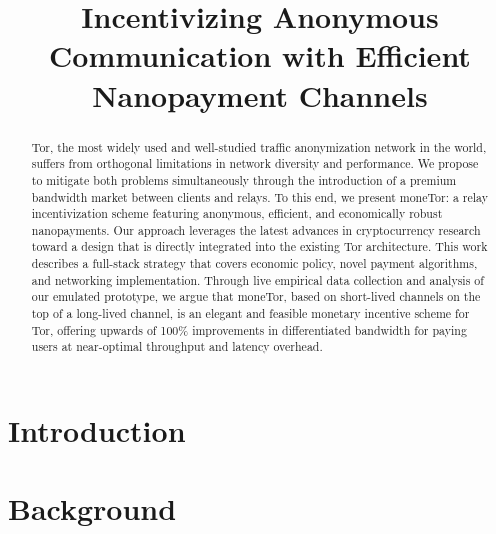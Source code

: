 \documentclass[USenglish,oneside,twocolumn]{article}
\begin{document}
 

\title{\huge Incentivizing Anonymous Communication with Efficient Nanopayment Channels} %


\begin{abstract}
{Tor, the most widely used and well-studied traffic anonymization network in
  the world, suffers from orthogonal limitations in network diversity and
  performance. We propose to mitigate both problems simultaneously through the
  introduction of a premium bandwidth market between clients and relays. To this
  end, we present moneTor: a relay incentivization scheme featuring anonymous,
  efficient, and economically robust nanopayments. Our approach leverages the
  latest advances in cryptocurrency research toward a design that is directly
  integrated into the existing Tor architecture. This work describes a
  full-stack strategy that covers economic policy, novel payment algorithms, and
  networking implementation. Through live empirical data collection and analysis
  of our emulated prototype, we argue that moneTor, based on short-lived channels on the top of a long-lived channel, is an elegant and
  feasible monetary incentive scheme for Tor, offering upwards of 100\%
  improvements in differentiated bandwidth for paying users at near-optimal
  throughput and latency overhead.}
\end{abstract}



  
  
 \maketitle


\section{Introduction}
\label{sec:introduction}


\section{Background}
\label{sec:background}

\end{document}
